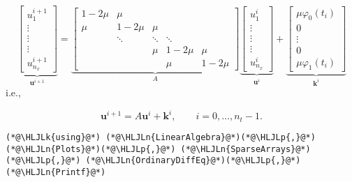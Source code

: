 \documentclass[12pt,a4paper]{article}
\newcommand{\HLJLk}[1]{\textcolor[RGB]{148,91,176}{\textbf{#1}}}
\newcommand{\HLJLn}[1]{#1}
\newcommand{\HLJLp}[1]{#1}
\begin{document}
\[
\underbrace{\begin{bmatrix}
u^{i+1}_{1} \\
\vdots \\
\vdots \\
\vdots \\
u^{i+1}_{n_x}
\end{bmatrix}}_{\mathbf{u}^{i+1}} = 
\underbrace{\begin{bmatrix}
1 - 2\mu & \mu & & & \\
\mu  & 1-2\mu & \mu  & & \\
      & \ddots & \ddots & \ddots & \\
      &        & \mu    & 1- 2\mu & \mu \\
      &        &        &\mu      & 1-2\mu
\end{bmatrix}}_{A}
\underbrace{\begin{bmatrix}
u^{i}_{1} \\
\vdots \\
\vdots \\
\vdots \\
u^{i}_{n_x}
\end{bmatrix}}_{\mathbf{u}^i}
+
\underbrace{\begin{bmatrix}
\mu\varphi_0(t_i) \\
0 \\
\vdots \\
0 \\
\mu \varphi_1(t_i)
\end{bmatrix}}_{\mathbf{k}^i}
\]
i.e., 

\[
\mathbf{u}^{i+1} = A\mathbf{u}^i + \mathbf{k}^i, \qquad i = 0, \ldots, n_t-1.
\]

\begin{lstlisting}
(*@\HLJLk{using}@*) (*@\HLJLn{LinearAlgebra}@*)(*@\HLJLp{,}@*) (*@\HLJLn{Plots}@*)(*@\HLJLp{,}@*) (*@\HLJLn{SparseArrays}@*)(*@\HLJLp{,}@*) (*@\HLJLn{OrdinaryDiffEq}@*)(*@\HLJLp{,}@*) (*@\HLJLn{Printf}@*)
\end{lstlisting}
\end{document}

